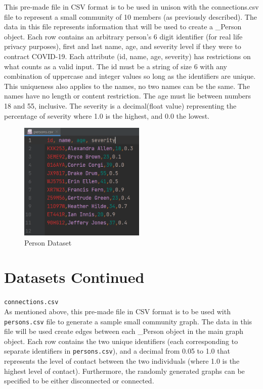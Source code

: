 \documentclass[fontsize=11pt]{article}
\newcommand{\ttt}[1]{\texttt{#1}}
\begin{document}
    This pre-made file in CSV format is to be used in unison with the connections.csv file to represent a small community of 10 members (as previously described). The data in this file represents information that will be used to create a \_Person object. Each row contains an arbitrary person's 6 digit identifier (for real life privacy purposes), first and last name, age, and severity level if they were to contract COVID-19. Each attribute (id, name, age, severity) has restrictions on what counts as a valid input. The id must be a string of size 6 with any combination of uppercase and integer values so long as the identifiers are unique. This uniqueness also applies to the names, no two names can be the same. The names have no length or content restriction. The age must lie between numbers 18 and 55, inclusive. The severity is a decimal(float value) representing the percentage of severity where 1.0 is the highest, and 0.0 the lowest.\\
    \begin{figure}[h]
        \centering
        \includegraphics[width=60mm,scale=0.3]{pictures/person_dataset.png}
        \caption{Person Dataset}
    \end{figure}
    \newpage
    \section*{Datasets Continued}
    \ttt{connections.csv} \\
    As mentioned above, this pre-made file in CSV format is to be used with \ttt{persons.csv} file to generate a sample small community graph. The data in this file will be used create edges between each \_Person object in the main graph object. Each row contains the two unique identifiers (each corresponding to separate identifiers in \ttt{persons.csv}), and a decimal from 0.05 to 1.0 that represents the level of contact between the two individuals (where 1.0 is the highest level of contact). Furthermore, the randomly generated graphs can be specified to be either disconnected or connected.
\end{document}
